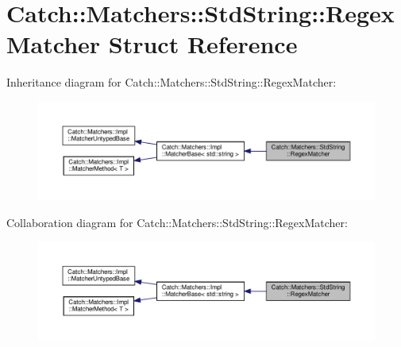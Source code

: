 \hypertarget{structCatch_1_1Matchers_1_1StdString_1_1RegexMatcher}{}\section{Catch\+::Matchers\+::Std\+String\+::Regex\+Matcher Struct Reference}
\label{structCatch_1_1Matchers_1_1StdString_1_1RegexMatcher}


Inheritance diagram for Catch\+::Matchers\+::Std\+String\+::Regex\+Matcher\+:\nopagebreak
\begin{figure}[H]
\begin{center}
\leavevmode
\includegraphics[width=350pt]{structCatch_1_1Matchers_1_1StdString_1_1RegexMatcher__inherit__graph}
\end{center}
\end{figure}


Collaboration diagram for Catch\+::Matchers\+::Std\+String\+::Regex\+Matcher\+:\nopagebreak
\begin{figure}[H]
\begin{center}
\leavevmode
\includegraphics[width=350pt]{structCatch_1_1Matchers_1_1StdString_1_1RegexMatcher__coll__graph}
\end{center}
\end{figure}
